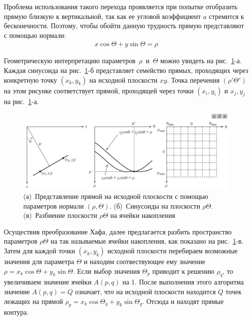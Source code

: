 \documentclass[12pt,a4paper]{article} %
\begin{document}
Проблема использования такого перехода проявляется при попытке отобразить прямую близкую к вертикальной, так как ее угловой коэффициент $a$ стремится к бесконечности. Поэтому, чтобы обойти данную трудность прямую представляют с помощью нормали:
\begin{gather}\label{norm1}
	x\cos{\Theta} + y\sin{\Theta} = \rho
\end{gather}

Геометрическую интерпретацию параметров~$\rho$~и~$\Theta$ можно увидеть на рис.~\ref{fig:norm}-а. Каждая синусоида на рис.~\ref{fig:norm}-б представляет семейство прямых, проходящих через конкретную точку $(x_k, y_k)$ на исходной плоскости $xy$. Точка перечения $(\rho'\Theta')$ на этом рисунке соответствует прямой, проходящей через точки $(x_i, y_i)$ и $x_j, y_j$ на рис.~\ref{fig:norm}-а.

\begin{figure}[h]
	
	\centering
	
	\includegraphics[width=0.8\linewidth]{norm.jpg}
	
	\caption{(а)~Представление прямой на исходной плоскости с помощью параметров нормали $(\rho, \Theta)$. 
	(б)~Синусоиды на плоскости $\rho \Theta$.
	(в)~Разбиение плоскости $\rho \Theta$ на ячейки накопления}
	
	\label{fig:norm}
	
\end{figure}

Осуществив преобразование Хафа, далее предлагается разбить пространство параметров $\rho \Theta$ на так называемые ячейки накопления, как показано на рис.~\ref{fig:norm}-в. Затем для каждой точки $(x_k, y_k)$ исходной плоскости перебираем возможные значения для параметра $\Theta$ и находим соотвествующее ему значение $\rho = x_k\cos{\Theta}+y_k\sin{\Theta}$. Если выбор значения $\Theta_p$ приводит к решению $\rho_q$, то увеличиваем значение ячейки $A(p,q)$ на 1. После выполнения этого алгоритма значение $A(p,q)=Q$ означает, что на исходной плоскости находится $Q$ точек лежащих на прямой $\rho_p = x_k\cos{\Theta_q}+y_k\sin{\Theta_q}$.
Отсюда и находят прямые контура. 
\end{document}
